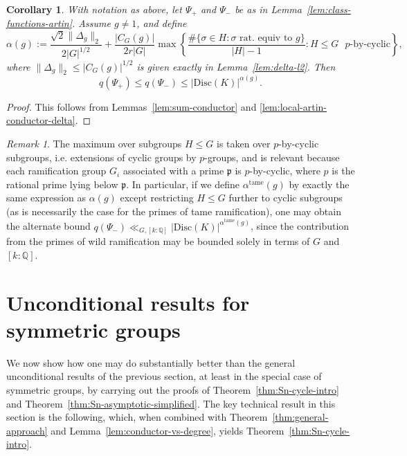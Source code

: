 \documentclass[12pt]{amsart}
\newtheorem{corollary}[theorem]{Corollary}
\theoremstyle{definition} \newtheorem{definition}[theorem]{Definition}
\theoremstyle{example} \newtheorem{example}[theorem]{Example}
\theoremstyle{remark} \newtheorem{remark}{Remark}[theorem]
\numberwithin{equation}{section}
\numberwithin{theorem}{section}
\renewcommand{\leq}{\leqslant}
\begin{document}
	\begin{corollary}
		\label{cor:less-simplified-conductor}
		With notation as above, let $\Psi_+$ and $\Psi_-$ be as in Lemma~\ref{lem:class-functions-artin}.  Assume $g \ne 1$, and define
			\[
				\alpha(g)
					:= \frac{\sqrt{2} \|\Delta_g\|_2 }{2 |G|^{1/2}} + \frac{|C_G(g)|}{2r|G|} \max\left\{ \frac{\#\{ \sigma \in H : \sigma \text{ rat. equiv to $g$}\}}{|H|-1} : H \leq G \text{ $p$-by-cyclic}\right\},
			\]
		where $\|\Delta_g\|_2 \leq |C_G(g)|^{1/2}$ is given exactly in Lemma~\ref{lem:delta-l2}.  Then
			\[
				q(\Psi_+) 
					\leq q(\Psi_-)
					\leq |\mathrm{Disc}(K)|^{\alpha(g)}.
			\]
	\end{corollary}
	\begin{proof}
		This follows from Lemmas~\ref{lem:sum-conductor} and \ref{lem:local-artin-conductor-delta}.
	\end{proof}
	
	\begin{remark}
		The maximum over subgroups $H \leq G$ is taken over $p$-by-cyclic subgroups, i.e. extensions of cyclic groups by $p$-groups, and is relevant because each ramification group $G_i$ associated with a prime $\mathfrak{p}$ is $p$-by-cyclic, where $p$ is the rational prime lying below $\mathfrak{p}$.  In particular, if we define $\alpha^\mathrm{tame}(g)$ by exactly the same expression as $\alpha(g)$ except restricting $H \leq G$ further to cyclic subgroups (as is necessarily the case for the primes of tame ramification), one may obtain the alternate bound $q(\Psi_-) \ll_{G,[k:\mathbb{Q}]} |\mathrm{Disc}(K)|^{\alpha^{\mathrm{tame}}(g)}$, since the contribution from the primes of wild ramification may be bounded solely in terms of $G$ and $[k:\mathbb{Q}]$.
	\end{remark}
	

\section{Unconditional results for symmetric groups}
	\label{sec:symmetric-groups}

	We now show how one may do substantially better than the general unconditional results of the previous section, at least in the special case of symmetric groups, by carrying out the proofs of Theorem~\ref{thm:Sn-cycle-intro} and Theorem~\ref{thm:Sn-asymptotic-simplified}.  The key technical result in this section is the following, which, when combined with Theorem~\ref{thm:general-approach} and Lemma~\ref{lem:conductor-vs-degree}, yields Theorem~\ref{thm:Sn-cycle-intro}.
	
\end{document}
